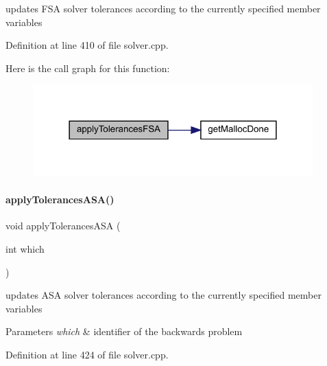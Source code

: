updates F\+SA solver tolerances according to the currently specified member variables 

Definition at line 410 of file solver.\+cpp.

Here is the call graph for this function\+:
\nopagebreak
\begin{figure}[H]
\begin{center}
\leavevmode
\includegraphics[width=306pt]{classamici_1_1_solver_a45ec22a0fddb6a8b37a3c3fdbdf7374f_cgraph}
\end{center}
\end{figure}
\mbox{\label{classamici_1_1_solver_abdf8989d57153fde8988e73a98979297}} 
\paragraph{\texorpdfstring{apply\+Tolerances\+A\+S\+A()}{applyTolerancesASA()}}
{\footnotesize\ttfamily void apply\+Tolerances\+A\+SA (\begin{DoxyParamCaption}\item[{int}]{which }\end{DoxyParamCaption})\hspace{0.3cm}{\ttfamily [protected]}}

updates A\+SA solver tolerances according to the currently specified member variables


\begin{DoxyParams}{Parameters}
{\em which} & identifier of the backwards problem \\
\hline
\end{DoxyParams}


Definition at line 424 of file solver.\+cpp.

